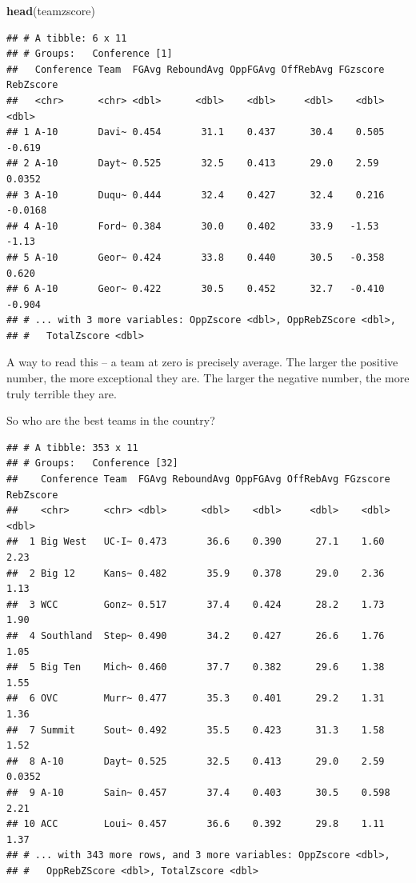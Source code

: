 \documentclass[
]{book}
\newenvironment{Shaded}{\begin{snugshade}}{\end{snugshade}}
\newcommand{\KeywordTok}[1]{\textcolor[rgb]{0.13,0.29,0.53}{\textbf{#1}}}
\newcommand{\NormalTok}[1]{#1}
\newcommand{\OperatorTok}[1]{\textcolor[rgb]{0.81,0.36,0.00}{\textbf{#1}}}
\newcommand{\StringTok}[1]{\textcolor[rgb]{0.31,0.60,0.02}{#1}}
\begin{document}
\begin{Shaded}
\begin{Highlighting}[]
\KeywordTok{head}\NormalTok{(teamzscore)}
\end{Highlighting}
\end{Shaded}

\begin{verbatim}
## # A tibble: 6 x 11
## # Groups:   Conference [1]
##   Conference Team  FGAvg ReboundAvg OppFGAvg OffRebAvg FGzscore RebZscore
##   <chr>      <chr> <dbl>      <dbl>    <dbl>     <dbl>    <dbl>     <dbl>
## 1 A-10       Davi~ 0.454       31.1    0.437      30.4    0.505   -0.619 
## 2 A-10       Dayt~ 0.525       32.5    0.413      29.0    2.59     0.0352
## 3 A-10       Duqu~ 0.444       32.4    0.427      32.4    0.216   -0.0168
## 4 A-10       Ford~ 0.384       30.0    0.402      33.9   -1.53    -1.13  
## 5 A-10       Geor~ 0.424       33.8    0.440      30.5   -0.358    0.620 
## 6 A-10       Geor~ 0.422       30.5    0.452      32.7   -0.410   -0.904 
## # ... with 3 more variables: OppZscore <dbl>, OppRebZScore <dbl>,
## #   TotalZscore <dbl>
\end{verbatim}

A way to read this -- a team at zero is precisely average. The larger the positive number, the more exceptional they are. The larger the negative number, the more truly terrible they are.

So who are the best teams in the country?

\begin{Shaded}
\end{Shaded}

\begin{verbatim}
## # A tibble: 353 x 11
## # Groups:   Conference [32]
##    Conference Team  FGAvg ReboundAvg OppFGAvg OffRebAvg FGzscore RebZscore
##    <chr>      <chr> <dbl>      <dbl>    <dbl>     <dbl>    <dbl>     <dbl>
##  1 Big West   UC-I~ 0.473       36.6    0.390      27.1    1.60     2.23  
##  2 Big 12     Kans~ 0.482       35.9    0.378      29.0    2.36     1.13  
##  3 WCC        Gonz~ 0.517       37.4    0.424      28.2    1.73     1.90  
##  4 Southland  Step~ 0.490       34.2    0.427      26.6    1.76     1.05  
##  5 Big Ten    Mich~ 0.460       37.7    0.382      29.6    1.38     1.55  
##  6 OVC        Murr~ 0.477       35.3    0.401      29.2    1.31     1.36  
##  7 Summit     Sout~ 0.492       35.5    0.423      31.3    1.58     1.52  
##  8 A-10       Dayt~ 0.525       32.5    0.413      29.0    2.59     0.0352
##  9 A-10       Sain~ 0.457       37.4    0.403      30.5    0.598    2.21  
## 10 ACC        Loui~ 0.457       36.6    0.392      29.8    1.11     1.37  
## # ... with 343 more rows, and 3 more variables: OppZscore <dbl>,
## #   OppRebZScore <dbl>, TotalZscore <dbl>
\end{verbatim}
\end{document}
